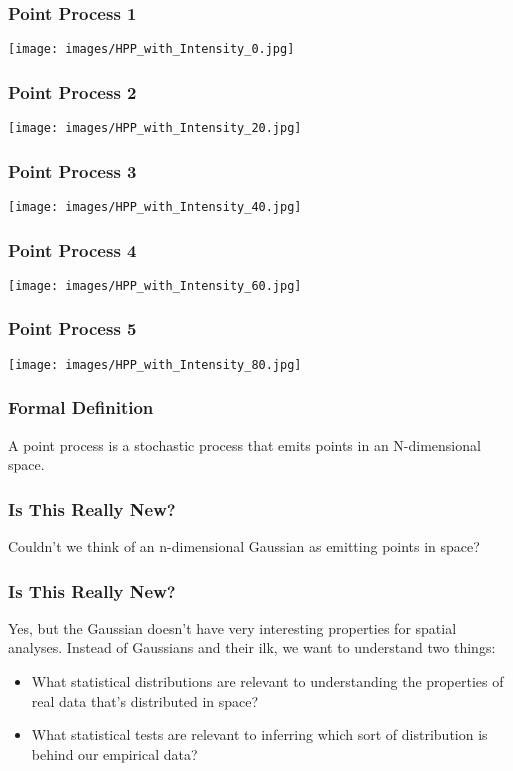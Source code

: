 \documentclass{beamer}
\begin{document}
\begin{frame}[fragile]
	\frametitle{Point Process 1}

	\begin{center}
		\texttt{[image: images/HPP\_with\_Intensity\_0.jpg]}
	\end{center}
\end{frame}

\begin{frame}[fragile]
	\frametitle{Point Process 2}

	\begin{center}
		\texttt{[image: images/HPP\_with\_Intensity\_20.jpg]}
	\end{center}
\end{frame}

\begin{frame}[fragile]
	\frametitle{Point Process 3}

	\begin{center}
		\texttt{[image: images/HPP\_with\_Intensity\_40.jpg]}
	\end{center}
\end{frame}

\begin{frame}[fragile]
	\frametitle{Point Process 4}

	\begin{center}
		\texttt{[image: images/HPP\_with\_Intensity\_60.jpg]}
	\end{center}
\end{frame}

\begin{frame}[fragile]
	\frametitle{Point Process 5}

	\begin{center}
		\texttt{[image: images/HPP\_with\_Intensity\_80.jpg]}
	\end{center}
\end{frame}

\begin{frame}[fragile]
	\frametitle{Formal Definition}

	A point process is a stochastic process that emits points in an N-dimensional space.
\end{frame}

\frame
{
	\frametitle{Is This Really New?}
	Couldn't we think of an n-dimensional Gaussian as emitting points in space?
}

\frame
{
	\frametitle{Is This Really New?}
	Yes, but the Gaussian doesn't have very interesting properties for spatial analyses. Instead of Gaussians and their ilk, we want to understand two things:
	\begin{itemize}
		\item<1->{What statistical distributions are relevant to understanding the properties of real data that's distributed in space?}
		\item<2->{What statistical tests are relevant to inferring which sort of distribution is behind our empirical data?}
	\end{itemize}
}
\end{document}
